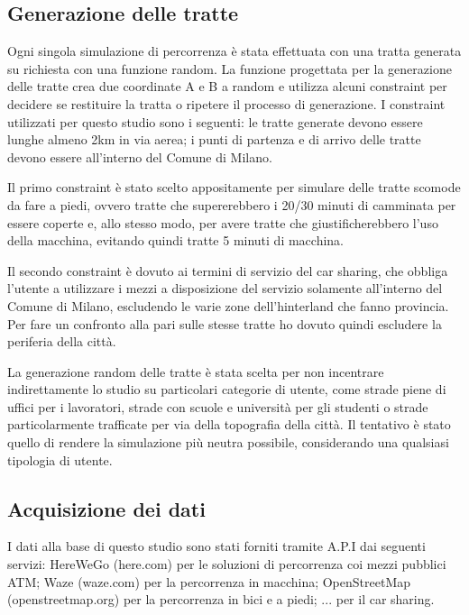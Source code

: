 \subsection{Generazione delle tratte}

Ogni singola simulazione di percorrenza è stata effettuata con una tratta generata su richiesta con una funzione random. La funzione progettata per la generazione delle tratte crea due coordinate A e B a random e utilizza alcuni constraint per decidere se restituire la tratta o ripetere il processo di generazione. I constraint utilizzati per questo studio sono i seguenti: le tratte generate devono essere lunghe almeno 2km in via aerea; i punti di partenza e di arrivo delle tratte devono essere all'interno del Comune di Milano.

Il primo constraint è stato scelto appositamente per simulare delle tratte scomode da fare a piedi, ovvero tratte che supererebbero i 20/30 minuti di camminata per essere coperte e, allo stesso modo, per avere tratte che giustificherebbero l'uso della macchina, evitando quindi tratte 5 minuti di macchina.

Il secondo constraint è dovuto ai termini di servizio del car sharing, che obbliga l'utente a utilizzare i mezzi a disposizione del servizio solamente all'interno del Comune di Milano, escludendo le varie zone dell'hinterland che fanno provincia. Per fare un confronto alla pari sulle stesse tratte ho dovuto quindi escludere la periferia della città.

La generazione random delle tratte è stata scelta per non incentrare indirettamente lo studio su particolari categorie di utente, come strade piene di uffici per i lavoratori, strade con scuole e università per gli studenti o strade particolarmente trafficate per via della topografia della città. Il tentativo è stato quello di rendere la simulazione più neutra possibile, considerando una qualsiasi tipologia di utente.


\subsection{Acquisizione dei dati}

I dati alla base di questo studio sono stati forniti tramite A.P.I dai seguenti servizi: HereWeGo (here.com) per le soluzioni di percorrenza coi mezzi pubblici ATM; Waze (waze.com) per la percorrenza in macchina; OpenStreetMap (openstreetmap.org) per la percorrenza in bici e a piedi; ... per il car sharing.

